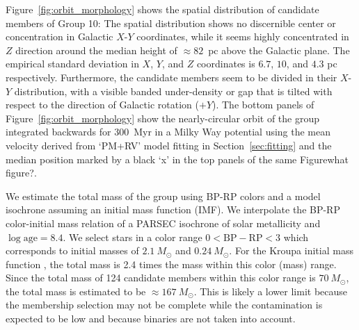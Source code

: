 \documentclass[modern,letterpaper]{aastex61}
\newcommand{\sectionname}{Section}
\newcommand{\figname}{Figure}
\newcommand{\groupTen}{Group 10}
\newcommand{\todo}[1]{{\color{crimson}#1}}
\begin{document}
Figure~\ref{fig:orbit_morphology} shows the spatial distribution of candidate members of \groupTen: The spatial distribution shows no discernible center or
concentration in Galactic $X$-$Y$ coordinates, while it seems highly
concentrated in $Z$ direction around the median height of $\approx 82$~pc above
the Galactic plane.
The empirical standard deviation in $X$, $Y$, and $Z$ coordinates
is $6.7$, $10$, and $4.3$ pc respectively.
Furthermore, the candidate members seem to be divided in their $X$-$Y$
distribution, with a visible banded under-density or gap that is tilted with respect to the direction of Galactic rotation ($+Y$).
The bottom panels of \figname~\ref{fig:orbit_morphology} show the
nearly-circular orbit of the group integrated backwards for $300$~Myr in a Milky
Way potential \citep{2015ApJS..216...29B} using the mean velocity derived from
`PM+RV' model fitting in \sectionname~\ref{sec:fitting} and the median position
marked by a black `x' in the top panels of the same \figname \todo{what figure?}.

We estimate the total mass of the group using BP-RP colors
and a model isochrone assuming an initial mass function (IMF).
We interpolate the BP-RP color-initial mass relation of a PARSEC isochrone of
solar metallicity and $\log\mathrm{age}=8.4$.
We select stars in a color range $0<\mathrm{BP-RP}<3$ which corresponds to
initial masses of $2.1~M_\odot$ and $0.24~M_\odot$.
For the Kroupa initial mass function \citep{2001MNRAS.322..231K},
the total mass is 2.4 times the mass within this color (mass) range.
Since the total mass of 124 candidate members within this color range is
$70~M_\odot$, the total mass is estimated to be $\approx167~M_\odot$.
This is likely a lower limit because
the membership selection may not be complete while the contamination is expected
to be low and because binaries are not taken into account.

\end{document}
